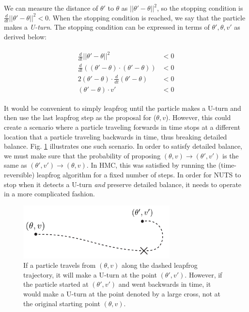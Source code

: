 \documentclass[12pt]{article}
\begin{document}
{We can measure the distance of $\theta'$ to $\theta$ as $||\theta'-\theta||^2$, so the stopping condition is $\frac{d}{dt} ||\theta'-\theta||^2 < 0$. When the stopping condition is reached, we say that the particle makes a \textit{U-turn}. The stopping condition can be expressed in terms of $\theta', \theta, v'$ as derived below:

\begin{align}
\begin{split}
\frac{d}{dt} ||\theta'-\theta||^2 &< 0 \\
\frac{d}{dt} \left((\theta'-\theta) \cdot (\theta'-\theta) \right) &< 0 \\
2(\theta'-\theta) \cdot \frac{d}{dt}(\theta'-\theta) &< 0 \\
(\theta'-\theta) \cdot v' &< 0
\end{split}
\label{eq_uturn}
\end{align}

It would be convenient to simply leapfrog until the particle makes a U-turn and then use the last leapfrog step as the proposal for ($\theta, v$). However, this could create a scenario where a particle traveling forwards in time stops at a different location that a particle traveling backwards in time, thus breaking detailed balance. Fig. \ref{fig_nuts_uturn_detailed_balance} illustrates one such scenario. In order to satisfy detailed balance, we must make sure that the probability of proposing $(\theta, v) \rightarrow (\theta', v')$ is the same as $(\theta', v') \rightarrow (\theta, v)$. In HMC, this was satisfied by running the (time-reversible) leapfrog algorithm for a fixed number of steps. In order for NUTS to stop when it detects a U-turn \textit{and} preserve detailed balance, it needs to operate in a more complicated fashion.

\begin{figure}[ht]
\centering
\includegraphics[width=8cm]{illustrations/nuts_uturn_detailed_balance.pdf}
\caption{If a particle travels from $(\theta, v)$ along the dashed leapfrog trajectory, it will make a U-turn at the point $(\theta', v')$. However, if the particle started at $(\theta', v')$ and went backwards in time, it would make a U-turn at the point denoted by a large cross, not at the original starting point $(\theta, v)$.}
\label{fig_nuts_uturn_detailed_balance}
\end{figure}

}
\end{document}
